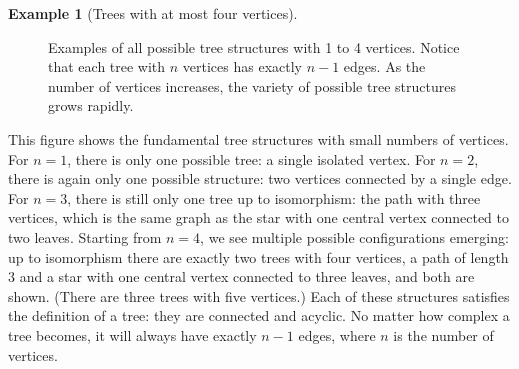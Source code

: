 \documentclass{article}
\theoremstyle{definition}
\newtheorem{example}{Example}
\begin{document}
\begin{example}[Trees with at most four vertices]
\begin{figure}[h]
\centering
{}
\caption{Examples of all possible tree structures with 1 to 4 vertices. Notice that each tree with $n$ vertices has exactly $n-1$ edges. As the number of vertices increases, the variety of possible tree structures grows rapidly.}
\label{fig:small-trees}
\end{figure}

This figure shows the fundamental tree structures with small numbers of vertices. For $n=1$, there is only one possible tree: a single isolated vertex. For $n=2$, there is again only one possible structure: two vertices connected by a single edge. For $n=3$, there is still only one tree up to isomorphism: the path with three vertices, which is the same graph as the star with one central vertex connected to two leaves. Starting from $n=4$, we see multiple possible configurations emerging: up to isomorphism there are exactly two trees with four vertices, a path of length 3 and a star with one central vertex connected to three leaves, and both are shown. (There are three trees with five vertices.) Each of these structures satisfies the definition of a tree: they are connected and acyclic. No matter how complex a tree becomes, it will always have exactly $n-1$ edges, where $n$ is the number of vertices.
\end{example}
\end{document}
